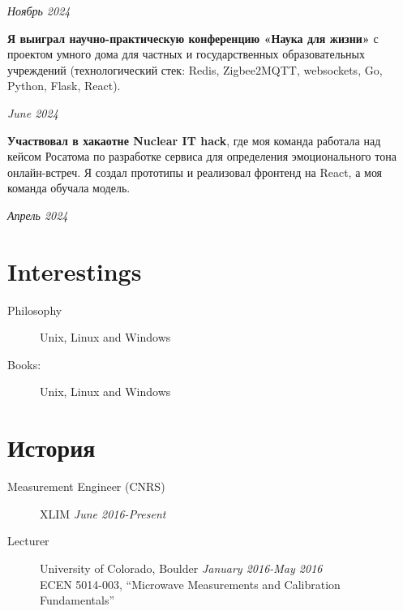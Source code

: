 \documentclass[margin,line]{resume}
\begin{document}
\begin{resume}
  \vspace{-6mm}

  \hfill \textsl{Ноябрь 2024}

  \textbf{Я выиграл научно-практическую конференцию «Наука для
  жизни»} с проектом умного дома для частных и государственных
  образовательных учреждений (технологический стек: Redis,
  Zigbee2MQTT, websockets, Go, Python, Flask, React).
  \vspace{-6mm}

  \hfill \textsl{June 2024}

  \textbf{Участвовал в хакаотне Nuclear IT hack}, где моя команда
  работала над кейсом Росатома по разработке сервиса для определения
  эмоционального тона онлайн-встреч. Я создал
  прототипы и реализовал фронтенд на React, а моя команда
  обучала модель.

  \vspace{-6mm}

  \hfill \textsl{Апрель 2024}

  \section{\mysidestyle Interestings}\vspace{2mm}
  \begin{description}
    \item[Philosophy] Unix, Linux and Windows
    \item[Books:] Unix, Linux and Windows
  \end{description}

  \vfill

  \section{\mysidestyle История}\vspace{2mm}

  \begin{description}

    \item[Measurement Engineer (CNRS)]\small{XLIM \hfill \textsl{June
      2016-Present}}\\
    \item[Lecturer]\small{University of Colorado, Boulder \hfill
      \textsl{January 2016-May 2016}}\\
      ECEN 5014-003, ``Microwave Measurements and Calibration Fundamentals''
      \vspace{2mm}


\end{description}
\end{resume}
\end{document}
